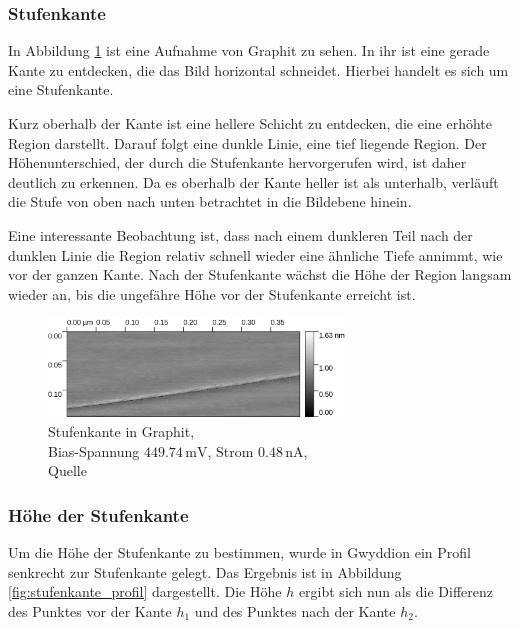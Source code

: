 \documentclass[12pt,a4paper]{scrartcl}
\numberwithin{equation}{section} %
\begin{document}
\hypertarget{messungen HOPG}{%
\subsubsection{Stufenkante}\label{messungen HOPG}}
In Abbildung \ref{abb:Stufenkante HOPG} ist eine Aufnahme von Graphit zu sehen. In ihr ist eine gerade Kante zu entdecken, die das Bild horizontal schneidet. Hierbei handelt es sich um eine Stufenkante.

Kurz oberhalb der Kante ist eine hellere Schicht zu entdecken, die eine erhöhte Region darstellt. Darauf folgt eine dunkle Linie, eine tief liegende Region. Der Höhenunterschied, der durch die Stufenkante hervorgerufen wird, ist daher deutlich zu erkennen. Da es oberhalb der Kante heller ist als unterhalb, verläuft die Stufe von oben nach unten betrachtet in die Bildebene hinein.

Eine interessante Beobachtung ist, dass nach einem dunkleren Teil nach der dunklen Linie die Region relativ schnell wieder eine ähnliche Tiefe annimmt, wie vor der ganzen Kante. Nach der Stufenkante wächst die Höhe der Region langsam wieder an, bis die ungefähre Höhe vor der Stufenkante erreicht ist.

\begin{figure}[h!]
	\centering
	\includegraphics[width=0.7\textwidth]{../media/B2.5/HOPG Stufenkante.jpg}
	\caption{Stufenkante in Graphit, \\
		Bias-Spannung $449.74 \mathrm{\,mV}$,
		Strom $0.48 \mathrm{\,nA}$, \\
		Quelle \cite{Grover}}
	\label{abb:Stufenkante HOPG}
\end{figure}

\hypertarget{Stufenkante Höhe}{
\subsubsection{Höhe der Stufenkante}\label{Stufenkante Höhe}}
Um die Höhe der Stufenkante zu bestimmen, wurde in Gwyddion \cite{Gwyddion} ein Profil senkrecht zur Stufenkante gelegt. Das Ergebnis ist in Abbildung \ref{fig:stufenkante_profil} dargestellt. Die Höhe $h$ ergibt sich nun als die Differenz des Punktes vor der Kante $h_1$ und des Punktes nach der Kante $h_2$.
\end{document}
